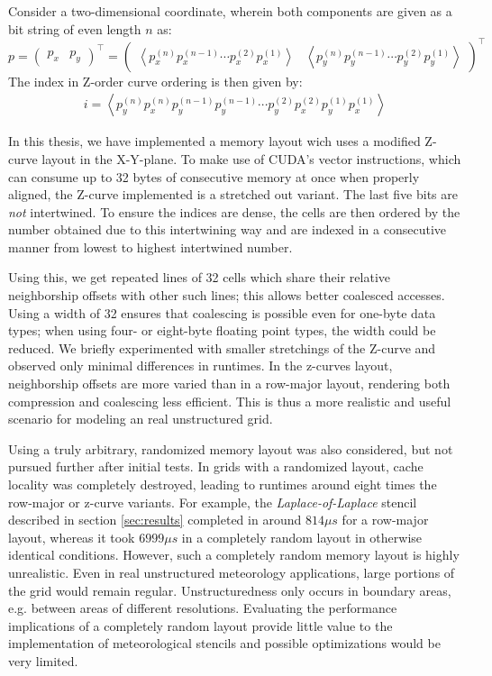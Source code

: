 Consider a two-dimensional coordinate, wherein both components are given as a bit string of even length $n$ as:
$$p=\begin{pmatrix}p_x & p_y\end{pmatrix}^\top=\begin{pmatrix}\left\langle p_x^{(n)} p_x^{(n-1)} \cdots p_x^{(2)} p_x^{(1)} \right\rangle & \left\langle p_y^{(n)} p_y^{(n-1)} \cdots p_y^{(2)} p_y^{(1)} \right\rangle\end{pmatrix}^\top$$
The index in Z-order curve ordering is then given by:
\begin{gather}
	i = \left\langle p_y^{(n)} p_x^{(n)} p_y^{(n-1)} p_y^{(n-1)} \cdots p_y^{(2)} p_x^{(2)} p_y^{(1)} p_x^{(1)}\right\rangle
\end{gather}

In this thesis, we have implemented a memory layout wich uses a modified Z-curve layout in the X-Y-plane. To make use of CUDA's vector instructions, which can consume up to 32 bytes of consecutive memory at once when properly aligned, the Z-curve implemented is a stretched out variant. The last five bits are \emph{not} intertwined. To ensure the indices are dense, the cells are then ordered by the number obtained due to this intertwining way and are indexed in a consecutive manner from lowest to highest intertwined number.

Using this, we get repeated lines of 32 cells which share their relative neighborship offsets with other such lines; this allows better coalesced accesses. Using a width of 32 ensures that coalescing is possible even for one-byte data types; when using four- or eight-byte floating point types, the width could be reduced. We briefly experimented with smaller stretchings of the Z-curve and observed only minimal differences in runtimes. In the z-curves layout, neighborship offsets are more varied than in a row-major layout, rendering both compression and coalescing less efficient. This is thus a more realistic and useful scenario for modeling an real unstructured grid.

Using a truly arbitrary, randomized memory layout was also considered, but not pursued further after initial tests. In grids with a randomized layout, cache locality was completely destroyed, leading to runtimes around eight times the row-major or z-curve variants. For example, the \emph{Laplace-of-Laplace} stencil described in section \ref{sec:results} completed in around $814 \mu s$ for a row-major layout, whereas it took $6999 \mu s$ in a completely random layout in otherwise identical conditions. However, such a completely random memory layout is highly unrealistic. Even in real unstructured meteorology applications, large portions of the grid would remain regular. Unstructuredness only occurs in boundary areas, e.g. between areas of different resolutions. Evaluating the performance implications of a completely random layout provide little value to the implementation of meteorological stencils and possible optimizations would be very limited.


